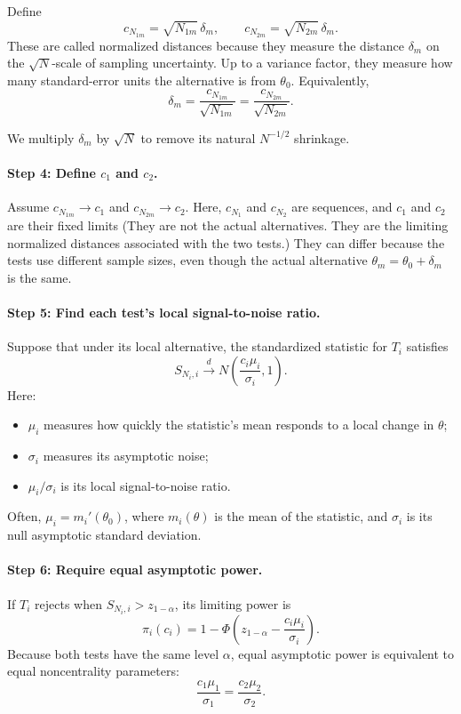 Define
\[
c_{N_{1m}}=\sqrt{N_{1m}}\,\delta_m,
\qquad
c_{N_{2m}}=\sqrt{N_{2m}}\,\delta_m.
\]
These are called normalized distances because they measure the distance $\delta_m$ on the $\sqrt N$-scale of sampling uncertainty. Up to a variance factor, they measure how many standard-error units the alternative is from $\theta_0$. Equivalently,
\[
\delta_m
=
\frac{c_{N_{1m}}}{\sqrt{N_{1m}}}
=
\frac{c_{N_{2m}}}{\sqrt{N_{2m}}}.
\tag{same actual alternative}
\]

We multiply $\delta_m$ by $\sqrt N$ to remove its natural $N^{-1/2}$ shrinkage.

\paragraph{Step 4: Define $c_1$ and $c_2$.}
Assume $c_{N_{1m}}\to c_1$ and $c_{N_{2m}}\to c_2$. Here, $c_{N_1}$ and $c_{N_2}$ are sequences, and $c_1$ and $c_2$ are their fixed limits (They are not the actual alternatives. They are the limiting normalized distances associated with the two tests.) They can differ because the tests use different sample sizes, even though the actual alternative $\theta_m=\theta_0+\delta_m$ is the same.

\paragraph{Step 5: Find each test's local signal-to-noise ratio.}

Suppose that under its local alternative, the standardized statistic for $T_i$ satisfies
\[
S_{N_i,i}
\xrightarrow{d}
N\left(\frac{c_i\mu_i}{\sigma_i},1\right).
\]
Here:
\begin{itemize}
    \item $\mu_i$ measures how quickly the statistic's mean responds to a local change in $\theta$;
    \item $\sigma_i$ measures its asymptotic noise;
    \item $\mu_i/\sigma_i$ is its local signal-to-noise ratio.
\end{itemize}
Often, $\mu_i=m_i'(\theta_0)$, where $m_i(\theta)$ is the mean of the statistic, and $\sigma_i$ is its null asymptotic standard deviation.

\paragraph{Step 6: Require equal asymptotic power.}
If $T_i$ rejects when $S_{N_i,i}>z_{1-\alpha}$, its limiting power is
\[
\pi_i(c_i)
=
1-\Phi\left(
z_{1-\alpha}-\frac{c_i\mu_i}{\sigma_i}
\right).
\]
Because both tests have the same level $\alpha$, equal asymptotic power is equivalent to equal noncentrality parameters:
\[
\frac{c_1\mu_1}{\sigma_1}
=
\frac{c_2\mu_2}{\sigma_2}.
\tag{same power}
\]

